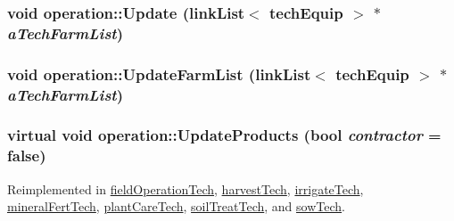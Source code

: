 \hypertarget{classoperation_af63de51c89b366f91ddd6b4597ff34e4}{
\subsubsection[{Update}]{\setlength{\rightskip}{0pt plus 5cm}void operation::Update ({\bf linkList}$<$ {\bf techEquip} $>$ $\ast$ {\em aTechFarmList})}}
\label{classoperation_af63de51c89b366f91ddd6b4597ff34e4}
\hypertarget{classoperation_a55df704ee7403e66bb470954a758bdac}{
\subsubsection[{UpdateFarmList}]{\setlength{\rightskip}{0pt plus 5cm}void operation::UpdateFarmList ({\bf linkList}$<$ {\bf techEquip} $>$ $\ast$ {\em aTechFarmList})}}
\label{classoperation_a55df704ee7403e66bb470954a758bdac}
\hypertarget{classoperation_a3f18f5e71dd6bdfdf304ed1a24e7ac2f}{
\subsubsection[{UpdateProducts}]{\setlength{\rightskip}{0pt plus 5cm}virtual void operation::UpdateProducts (bool {\em contractor} = {\ttfamily false})}}
\label{classoperation_a3f18f5e71dd6bdfdf304ed1a24e7ac2f}


Reimplemented in \hyperlink{classfield_operation_tech_ab0b2bf71efca78b637837fc4d0e3a9d4}{fieldOperationTech}, \hyperlink{classharvest_tech_a80aa806fd5fa0f652b8ead63fb8976a4}{harvestTech}, \hyperlink{classirrigate_tech_a5a125198ead652bcf1c8307fbc8ef3b5}{irrigateTech}, \hyperlink{classmineral_fert_tech_aeaae651d9f15846abd36be1a03e782db}{mineralFertTech}, \hyperlink{classplant_care_tech_a877ed4e1f3d84637783c1ac0474a6bc6}{plantCareTech}, \hyperlink{classsoil_treat_tech_aea3565eebbd55354cbee50d13c1c892a}{soilTreatTech}, and \hyperlink{classsow_tech_a0cfbd371272aa15a18bca486a2926464}{sowTech}.

